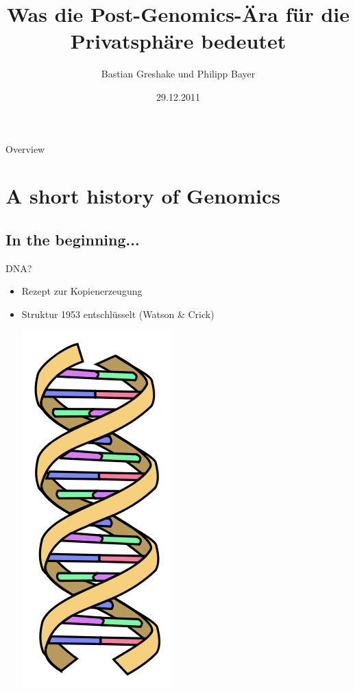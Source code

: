 \documentclass[12pt,a4paper]{beamer}
\title[Open-GWAS]{Was die Post-Genomics-\"Ara f\"ur die Privatsph\"are bedeutet}%
\date{29.12.2011}
\author{Bastian Greshake und Philipp Bayer}
\begin{document}
\begin{frame}
\titlepage
\end{frame}

\begin{frame}{Overview}
\tableofcontents
\end{frame}

\section{A short history of Genomics}
\subsection{In the beginning...}

\begin{frame}{DNA?}
	\begin{itemize}
		\item Rezept zur Kopienerzeugung
		\pause \item Struktur 1953 entschl\"usselt (Watson \& Crick)
		\begin{center}
			\includegraphics[scale=0.3]{220px-DNA_simple.png} \\
		\end{center}
	\end{itemize} 
\end{frame}
\end{document}
